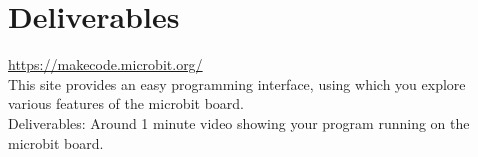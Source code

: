 \section*{Deliverables}

\url{https://makecode.microbit.org/} \\
This site provides an easy programming interface, using which you explore various features of the microbit board.\\
Deliverables: Around 1 minute video showing your program running on the microbit board.
